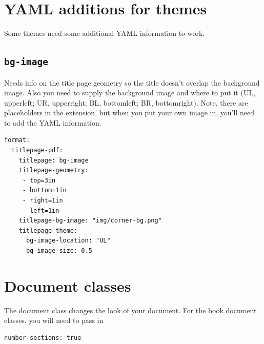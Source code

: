 \documentclass[
  oneside,
  open=any]{scrbook}
\renewcommand*\contentsname{Table of contents}
\newcommand\contentsname{Table of contents}
\begin{document}
\ifdefined\Shaded\renewenvironment{Shaded}{\begin{tcolorbox}[sharp corners, boxrule=0pt, enhanced, borderline west={3pt}{0pt}{shadecolor}, breakable, interior hidden, frame hidden]}{\end{tcolorbox}}\fi

\renewcommand*\contentsname{Table of contents}
{
\setcounter{tocdepth}{2}
\tableofcontents
}
\listoffigures
\listoftables
\mainmatter
\hypertarget{yaml-additions-for-themes}{%
\section{YAML additions for themes}\label{yaml-additions-for-themes}}

Some themes need some additional YAML information to work.

\hypertarget{bg-image}{%
\subsection{\texorpdfstring{\texttt{bg-image}}{bg-image}}\label{bg-image}}

Needs info on the title page geometry so the title doesn't overlap the
background image. Also you need to supply the background image and where
to put it (UL, upperleft; UR, upperright; BL, bottomleft; BR,
bottomright). Note, there are placeholders in the extension, but when
you put your own image in, you'll need to add the YAML information.

\begin{verbatim}
format: 
  titlepage-pdf:
    titlepage: bg-image
    titlepage-geometry: 
     - top=3in
     - bottom=1in
     - right=1in
     - left=1in
    titlepage-bg-image: "img/corner-bg.png"
    titlepage-theme:
      bg-image-location: "UL"
      bg-image-size: 0.5
\end{verbatim}

\hypertarget{document-classes}{%
\section{Document classes}\label{document-classes}}

The document class changes the look of your document. For the book
document classes, you will need to pass in

\begin{verbatim}
number-sections: true
\end{verbatim}
\end{document}
